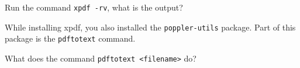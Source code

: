 \begin{challenge}
\begin{task}
\begin{questions}
            \item Run the command \texttt{xpdf -rv}, what is the output?
        \end{questions}
    \end{task}
    \begin{task}
    While installing xpdf, you also installed the \texttt{poppler-utils} package. Part of this package is the \texttt{pdftotext} command.
        \begin{questions}
            \item What does the command \texttt{pdftotext <filename>} do?
        \end{questions}
    \end{task}
\end{challenge}
    